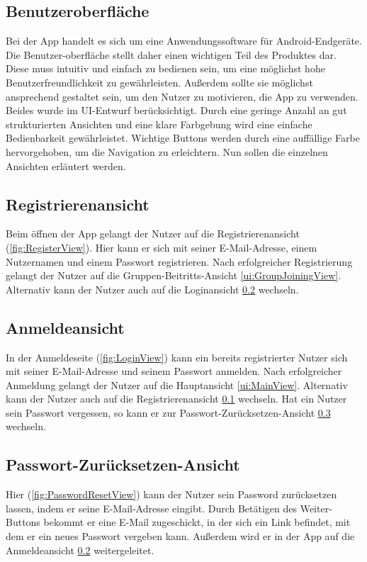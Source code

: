 \documentclass[parskip=full]{scrartcl}
\begin{document}
\subsection*{Benutzeroberfläche}
Bei der App handelt es sich um eine Anwendungssoftware für Android-Endgeräte. Die Benutzer-oberfläche stellt daher einen wichtigen Teil des Produktes dar. Diese muss intuitiv und einfach zu bedienen sein, um eine möglichst hohe Benutzerfreundlichkeit zu gewährleisten. Außerdem sollte sie möglichst ansprechend gestaltet sein, um den Nutzer zu motivieren, die App zu verwenden. Beides wurde im UI-Entwurf berücksichtigt. Durch eine geringe Anzahl an gut strukturierten Ansichten und eine klare Farbgebung wird eine einfache Bedienbarkeit gewährleistet. Wichtige Buttons werden durch eine auffällige Farbe hervorgehoben, um die Navigation zu erleichtern. Nun sollen die einzelnen Ansichten erläutert werden.

\subsection{Registrierenansicht}
\label{ui:RegisterView}
Beim öffnen der App gelangt der Nutzer auf die Registrierenansicht (\autoref{fig:RegisterView}). Hier kann er sich mit seiner E-Mail-Adresse, einem Nutzernamen und einem Passwort registrieren. Nach erfolgreicher Registrierung gelangt der Nutzer auf die Gruppen-Beitritts-Ansicht \ref{ui:GroupJoiningView}. Alternativ kann der Nutzer auch auf die Loginansicht \ref{ui:LoginView} wechseln.

\subsection{Anmeldeansicht}
\label{ui:LoginView}
In der Anmeldeseite (\autoref{fig:LoginView}) kann ein bereits registrierter Nutzer sich mit seiner E-Mail-Adresse und seinem Passwort anmelden. Nach erfolgreicher Anmeldung gelangt der Nutzer auf die Hauptansicht \ref{ui:MainView}. Alternativ kann der Nutzer auch auf die Registrierenansicht \ref{ui:RegisterView} wechseln. 
Hat ein Nutzer sein Passwort vergessen, so kann er zur Passwort-Zurücksetzen-Ansicht \ref{ui:PasswordResetView} wechseln.

\subsection{Passwort-Zurücksetzen-Ansicht}
\label{ui:PasswordResetView}
Hier (\autoref{fig:PasswordResetView}) kann der Nutzer sein Password zurücksetzen lassen, indem er seine E-Mail-Adresse eingibt. Durch Betätigen des Weiter-Buttons bekommt er eine E-Mail zugeschickt, in der sich ein Link befindet, mit dem er ein neues Passwort vergeben kann. Außerdem wird er in der App auf die Anmeldeansicht \ref{ui:LoginView} weitergeleitet.
\end{document}
